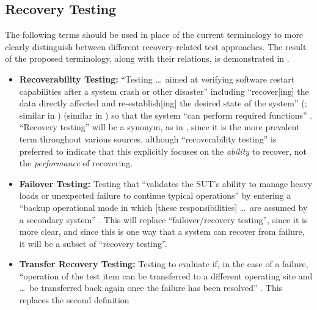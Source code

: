 \subsection{Recovery Testing}
\label{rec-test-rec}
The following terms should be used in place of the current terminology to
more clearly distinguish between different recovery-related test approaches.
The result of the proposed terminology, along with their relations, is
demonstrated in .

\recoveryGraphs{}

\begin{itemize}
    \item \textbf{Recoverability Testing:} ``Testing \dots\ aimed at
          verifying software restart capabilities after a system crash or
          other disaster'' \citep[p.~5-9]{SWEBOK2024} including ``recover[ing]
          the data directly affected and re-establish[ing] the desired state
          of the system''
          \ifnotpaper
              (\citealp{ISO_IEC2023a}; similar in \citealp[p.~7-10]{SWEBOK2024})
          \else
              \cite{ISO_IEC2023a} (similar in \cite[p.~7-10]{SWEBOK2024})
          \fi so that the system ``can perform
          required functions'' \citep[p.~370]{IEEE2017}. ``Recovery testing''
          will be a synonym, as in \citep[p.~47]{Kam2008}, since it is the
          more prevalent term throughout various sources, although
          ``recoverability testing'' is preferred to indicate that this
          explicitly focuses on the \emph{ability} to
          recover, not the \emph{performance} of recovering.
    \item \textbf{Failover Testing:} Testing that ``validates the SUT's
          ability to manage heavy loads or unexpected failure to continue
          typical operations'' \cite[p.~5-9]{SWEBOK2024} by entering a
          ``backup operational mode in which [these responsibilities] \dots\
          are assumed by a secondary system'' \citepISTQB{}. This will
          replace ``failover/recovery testing'', since it is more clear, and
          since this is one way that a system can recover from failure, it
          will be a subset of ``recovery testing''.
    \item \textbf{Transfer Recovery Testing:} Testing to evaluate if,
          in the case of a failure, ``operation of the test item can be
          transferred to a different operating site and \dots\ be transferred
          back again once the failure has been resolved''
          \citeyearpar[p.~37]{IEEE2021}. This replaces the second definition

\end{itemize}

